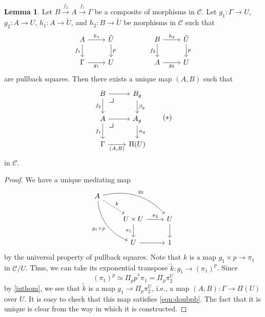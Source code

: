 \documentclass[10pt,letterpaper,cm]{nupset}
\theoremstyle{definition}
\theoremstyle{theorem}
\newtheorem{lemma}[definition]{Lemma}
\theoremstyle{remark}
\newcommand{\0}{\mathbf{0}}
\newcommand{\1}{\mathbf{1}}
\newcommand{\2}{\mathbf{2}}
\renewcommand{\c}{\mathscr{C}}
\begin{document}
\begin{lemma}\label{generic}
Let $B \overset{f_2}{\longrightarrow} A \overset{f_1}{\longrightarrow} \Gamma$ be a composite of morphisms in $\c$. Let $g_1: \Gamma \to U$, $g_2 : A\to U$, $h_1: A\to \tilde{U}$, and $h_2 : B \to \tilde{U}$ be morphisms in $\c$ such that 
\[
\begin{tikzcd}
A \arrow[r, "h_1"] \arrow[d, "f_1"'] & \tilde{U} \arrow[d, "p"] &  & B \arrow[r, "h_2"] \arrow[d, "f_2"'] & \tilde{U} \arrow[d, "p"] \\
\Gamma \arrow[r, "g_1"']             & U                        &  & A \arrow[r, "g_2"']                  & U                       
\end{tikzcd}
\] are pullback squares. Then there exists a unique map $\left(A, B\right)$ such that 
\[
\label{eqn:doubpb} \begin{tikzcd}
B \arrow[d, "f_2"'] \arrow[r]   \arrow[dr, phantom, "\scalebox{1.5}{\color{black}$\lrcorner$}", very near start] & B_g \arrow[d, "\beta_g"]  \\
A \arrow[d, "f_1"'] \arrow[r]   \arrow[dr, phantom, "\scalebox{1.5}{\color{black}$\lrcorner$}", very near start] & A_g \arrow[d, "\alpha_g"] \\
\Gamma \arrow[r, "{\left(A, B\right)}"']              & \Pi(U)                   
\end{tikzcd} \tag{$\ast$}
\] in $\c$.
\end{lemma}
\begin{proof}
We have a unique mediating map
\[
\begin{tikzcd}
A \arrow[rrd, "g_2", bend left] \arrow[rdd, "g_1\times p"', bend right] \arrow[rd, "k", dashed] &                                                  &             \\
                                                                                                & U\times U \arrow[r, "\pi_2"] \arrow[d, "\pi_1"'] & U \arrow[d] \\
                                                                                                & U \arrow[r]                                      & 1          
\end{tikzcd}
\] by the universal property of pullback squares. Note that $k$ is a map $g_1 \times p \to \pi_1$ in $\c/U$. Thus, we can take its exponential transpose $\tilde{k} : g_1 \to \left(\pi_1\right)^p$. Since $$\left(\pi_1\right)^p \simeq \Pi_pp^{\ast}{\pi_1}= \Pi_p{\pi_2^U}$$ by \cref{inthom}, we see that  $\tilde{k}$ is a map $g_1 \to  \Pi_p{\pi_2^U}$, i.e., a map $\left(A, B\right) : \Gamma \to \Pi(U)$ over $U$. It is easy to check that this map satisfies \eqref{eqn:doubpb}. The fact that it is unique is clear from the way in which  it is constructed.
\end{proof}
\end{document}
